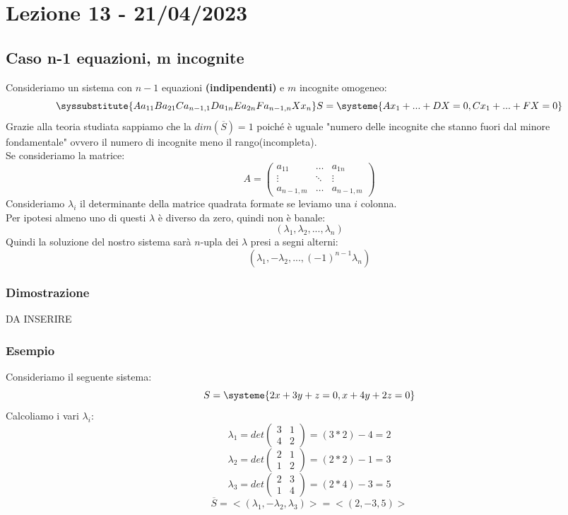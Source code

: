 \section{Lezione 13 - 21/04/2023}

\subsection{Caso n-1 equazioni, m incognite}
Consideriamo un sistema con $n-1$ equazioni \textbf{(indipendenti)} e $m$ incognite omogeneo:
$$ 
\syssubstitute{A{a_{11}}B{a_{21}}C{a_{n-1,1}}D{a_{1n}}E{a_{2n}}F{a_{n-1,n}}X{x_{n}}}
S=
\systeme{
  A x_1 +...+ D X  = 0,
  C x_1 +...+ F X = 0
}
$$
Grazie alla teoria studiata sappiamo che la $dim(\overline{S})=1$ poiché è uguale "numero delle incognite che stanno fuori dal minore fondamentale" ovvero il numero di incognite meno il rango(incompleta).\\
Se consideriamo la matrice:
$$ 
A = 
\begin{pmatrix}
a_{11} & \dots & a_{1n} \\
\vdots & \ddots & \vdots \\
a_{n-1,m} & \dots & a_{n-1,m}
\end{pmatrix}
$$
Consideriamo $\lambda_i$ il determinante della matrice quadrata formate se leviamo una $i$ colonna.\\
Per ipotesi almeno uno di questi $\lambda$ è diverso da zero, quindi non è banale:
$$ (\lambda_1,\lambda_2,...,\lambda_n) $$
Quindi la soluzione del nostro sistema sarà $n$-upla dei $\lambda$ presi a segni alterni:
$$ (\lambda_1,-\lambda_2,...,(-1)^{n-1} \lambda_n) $$

\subsubsection{Dimostrazione}
DA INSERIRE

\subsubsection{Esempio}
Consideriamo il seguente sistema:
$$ 
S = 
\systeme
{
2x+3y+z = 0,
x+4y+2z=0
}
$$
Calcoliamo i vari $\lambda_i$:
$$ \lambda_1 = det \begin{pmatrix} 3 & 1 \\ 4 & 2 \end{pmatrix} = (3*2)-4 = 2 $$
$$ \lambda_2 = det \begin{pmatrix} 2 & 1 \\ 1 & 2 \end{pmatrix} = (2*2)-1 = 3 $$
$$ \lambda_3 = det \begin{pmatrix} 2 & 3 \\ 1 & 4 \end{pmatrix} = (2*4)-3 = 5 $$
$$ \overline{S}=<(\lambda_1,-\lambda_2,\lambda_3)> = <(2,-3,5)> $$


